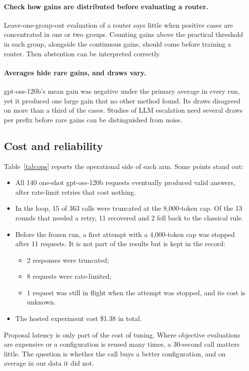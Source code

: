 \paragraph{Check how gains are distributed before evaluating a router.} Leave-one-group-out evaluation of a router says little when positive cases are concentrated in one or two groups. Counting gains above the practical threshold in each group, alongside the continuous gains, should come before training a router. Then abstention can be interpreted correctly.

\paragraph{Averages hide rare gains, and draws vary.} gpt-oss-120b's mean gain was negative under the primary average in every run, yet it produced one large gain that no other method found. Its draws disagreed on more than a third of the cases. Studies of LLM escalation need several draws per prefix before rare gains can be distinguished from noise.

\subsection{Cost and reliability}

Table~\ref{tab:ops} reports the operational side of each arm. Some points stand out:
\begin{itemize}
  \item All 140 one-shot gpt-oss-120b requests eventually produced valid answers, after rate-limit retries that cost nothing.
  \item In the loop, 15 of 363 calls were truncated at the 8,000-token cap. Of the 13 rounds that needed a retry, 11 recovered and 2 fell back to the classical rule.
  \item Before the frozen run, a first attempt with a 4,000-token cap was stopped after 11 requests. It is not part of the results but is kept in the record:
  \begin{itemize}
    \item 2 responses were truncated;
    \item 8 requests were rate-limited;
    \item 1 request was still in flight when the attempt was stopped, and its cost is unknown.
  \end{itemize}
  \item The hosted experiment cost \$1.38 in total.
\end{itemize}
Proposal latency is only part of the cost of tuning. Where objective evaluations are expensive or a configuration is reused many times, a 30-second call matters little. The question is whether the call buys a better configuration, and on average in our data it did not.

